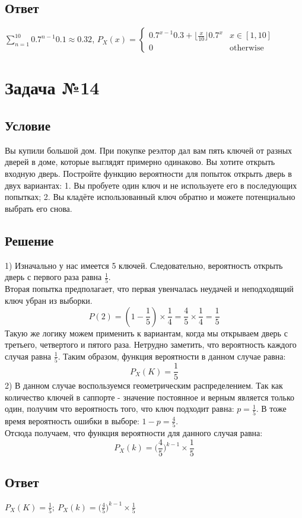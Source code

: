 \documentclass{article}
\begin{document}
\subsection*{Ответ}
$\sum\limits_{n=1}^{10}0.7^{n-1}0.1\approx 0.32$, $P_X(x) = \begin{cases}
    0.7^{x-1}0.3 + {\lfloor \frac{x}{10} \rfloor}0.7^{x}& x \in [1, 10]\\
    0& \text{otherwise}
\end{cases}$
\section*{Задача №14}
\subsection*{Условие}
Вы купили большой дом. При покупке реэлтор дал вам пять ключей от
разных дверей в доме, которые выглядят примерно одинаково. Вы хотите открыть
входную дверь. Постройте функцию вероятности для попыток открыть дверь в двух
вариантах: 1. Вы пробуете один ключ и не используете его в последующих попытках;
2. Вы кладёте использованный ключ обратно и можете потенциально выбрать его
снова. 
\subsection*{Решение}
1) Изначально у нас имеется 5 ключей. Следовательно, вероятность открыть дверь с первого раза равна $\frac{1}{5}$.\\
Вторая попытка предполагает, что первая увенчалась неудачей и неподходящий ключ убран из выборки.
\[
    P(2) = (1-\frac{1}{5})\times \frac{1}{4} = \frac{4}{5} \times \frac{1}{4} = \frac{1}{5}
\]
Такую же логику можем применить к вариантам, когда мы открываем дверь с третьего, четвертого и пятого раза. Нетрудно заметить, что вероятность каждого случая равна $\frac{1}{5}$.
Таким образом, функция вероятности в данном случае равна:
\[
    P_X(K) = \frac{1}{5}
\]
2) В данном случае воспользуемся геометрическим распределением. Так как количество ключей в саппорте - значение постоянное и верным является только один, получим что вероятность того, что ключ подходит равна: $p = \frac{1}{5}$. В тоже время вероятность ошибки в  выборе: $1-p = \frac{4}{5}$.\\
Отсюда получаем, что функция вероятности для данного случая равна:
\[
    P_X(k) = \biggl(\frac{4}{5}\biggr)^{k-1}\times\frac{1}{5}
\]
\subsection*{Ответ}
$P_X(K) = \frac{1}{5}; \     P_X(k) = \biggl(\frac{4}{5}\biggr)^{k-1}\times\frac{1}{5}$
\end{document}
